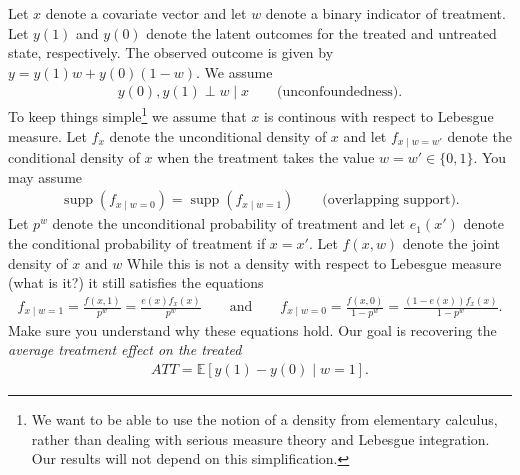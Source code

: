 \documentclass[a4paper]{scrartcl}
\newcommand{\E}{\mathbb{E}}
\DeclareMathOperator{\supp}{supp}
\begin{document}
Let $x$ denote a covariate vector and let $w$ denote a binary indicator of treatment. 
Let $y(1)$ and $y(0)$ denote the latent outcomes for the treated and untreated state, respectively. 
The observed outcome is given by $y = y(1)w + y(0)(1 - w)$.
We assume 
\begin{align*}
	y(0), y(1) \perp w \mid x \qquad \text{(unconfoundedness)}.
\end{align*}
To keep things simple\footnote{We want to be able to use the notion of a density from elementary calculus, rather than dealing with serious measure theory and Lebesgue integration. Our results will not depend on this simplification.} we assume that $x$ is continous with respect to Lebesgue measure. Let $f_x$ denote the unconditional density of $x$ and let $f_{x \mid w = w'}$ denote the conditional density of $x$ when the treatment takes the value $w = w' \in \{0,1\}$. 
You may assume 
\begin{align*}
	\supp(f_{x \mid w = 0}) = \supp(f_{x \mid w = 1}) \qquad \text{(overlapping support).}
\end{align*}
Let $p^w$ denote the unconditional probability of treatment and let $e_1(x')$ denote the conditional probability of treatment if $x = x'$.
Let $f(x, w)$ denote the joint density of $x$ and $w$ While this is not a density with respect to Lebesgue measure (what is it?) it still satisfies the equations 
\begin{align*}
	f_{x \mid w = 1} = \frac{f(x, 1)}{p^w} = \frac{e(x) f_x(x)}{p^w}
	\qquad \text{and} \qquad 
	f_{x \mid w = 0} = \frac{f(x, 0)}{1 - p^w} = \frac{(1 - e(x)) f_x(x)}{1 - p^w}. 
\end{align*}
Make sure you understand why these equations hold. Our goal is recovering the \emph{average treatment effect on the treated}
\begin{align*}
	ATT = \E \left[y(1) - y(0) \mid w = 1\right].
\end{align*}
\end{document}
